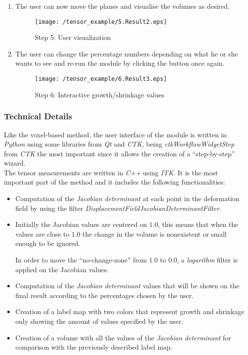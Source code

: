 \begin{enumerate}
\item The user can now move the planes and visualise the volumes as desired.
  
  \begin{figure}[H]
    \centering
    \texttt{[image: /tensor\_example/5.Result2.eps]}
    \caption{Step 5: User visualization}
    \label{tensor_ex_5}
  \end{figure}


\item The user can change the percentage numbers depending on what he
  or she wants to see and re-run the module by clicking the button
  once again.
  
  \begin{figure}[H]
    \centering
    \texttt{[image: /tensor\_example/6.Result3.eps]}
    \caption{Step 6: Interactive growth/shrinkage values}
    \label{tensor_ex_6}
  \end{figure}

\end{enumerate}


\subsubsection{Technical Details}
Like the voxel-based method, the user interface of the module is
written in \textit{Python} using some libraries from \textit{Qt} and
\textit{CTK}, being \textit{ctkWorkflowWidgetStep} from \textit{CTK}
the most important since it allows the creation of a ``step-by-step''
wizard.\\

The tensor measurements are written in \textit{C++} using
\textit{ITK}. It is the most important part of the method and it
includes the following functionalities:
\begin{itemize}
\item Computation of the \textit{Jacobian determinant} at each point
  in the deformation field by using the filter
  \textit{DisplacementFieldJacobianDeterminantFilter}.
\item Initially the Jacobian values are centered on $1.0$, this means
  that when the values are close to $1.0$ the change in the volume is
  nonexistent or small enough to be ignored. 

  In order to move the ``no-change-zone'' from $1.0$ to $0.0$, a
  \textit{logarithm} filter is applied on the Jacobian values.
  
\item Computation of the \textit{Jacobian determinant} values that
  will be shown on the final result according to the percentages
  chosen by the user.
\item Creation of a label map with two colors that represent growth
  and shrinkage only showing the amount of values specified by the
  user.
\item Creation of a volume with all the values of the \textit{Jacobian
    determinant} for comparison with the previously described label
  map.
\end{itemize}
